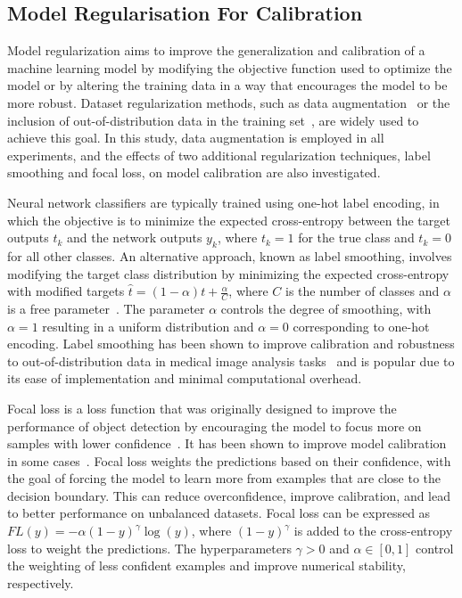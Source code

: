 \subsection{Model Regularisation For Calibration}
Model regularization aims to improve the generalization and calibration of a machine learning model by modifying the objective function used to optimize the model or by altering the training data in a way that encourages the model to be more robust. Dataset regularization methods, such as data augmentation~\cite{hendrycks2019augmix} or the inclusion of out-of-distribution data in the training set~\cite{hendrycks2018deep}, are widely used to achieve this goal. In this study, data augmentation is employed in all experiments, and the effects of two additional regularization techniques, label smoothing and focal loss, on model calibration are also investigated.

Neural network classifiers are typically trained using one-hot label encoding, in which the objective is to minimize the expected cross-entropy between the target outputs $t_k$ and the network outputs $y_k$, where $t_k=1$ for the true class and $t_k=0$ for all other classes. An alternative approach, known as label smoothing, involves modifying the target class distribution by minimizing the expected cross-entropy with modified targets $\hat{t} = (1 - \alpha) t + \frac{\alpha}{C}$, where $C$ is the number of classes and $\alpha$ is a free parameter~\cite{szegedy2016rethinking}. The parameter $\alpha$ controls the degree of smoothing, with $\alpha = 1$ resulting in a uniform distribution and $\alpha = 0$ corresponding to one-hot encoding. Label smoothing has been shown to improve calibration and robustness to out-of-distribution data in medical image analysis tasks~\cite{islam2021spatially} and is popular due to its ease of implementation and minimal computational overhead.

Focal loss is a loss function that was originally designed to improve the performance of object detection by encouraging the model to focus more on samples with lower confidence~\cite{lin2017focal}. It has been shown to improve model calibration in some cases~\cite{mukhoti2020calibrating}. Focal loss weights the predictions based on their confidence, with the goal of forcing the model to learn more from examples that are close to the decision boundary. This can reduce overconfidence, improve calibration, and lead to better performance on unbalanced datasets. Focal loss can be expressed as $FL(y) = -\alpha(1-y)^\gamma\log(y)$, where $(1-y)^\gamma$ is added to the cross-entropy loss to weight the predictions. The hyperparameters $\gamma > 0$ and $\alpha \in [0, 1]$ control the weighting of less confident examples and improve numerical stability, respectively.


